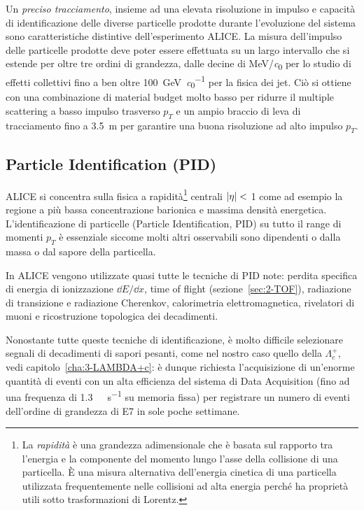         Un \textit{preciso tracciamento}, insieme ad una elevata risoluzione in impulso e capacità di identificazione delle diverse particelle prodotte durante l’evoluzione del sistema sono caratteristiche distintive dell’esperimento ALICE. La misura dell’impulso delle particelle prodotte deve poter essere effettuata su un largo intervallo che si estende per oltre tre ordini di grandezza, dalle decine di \unit[per-mode = symbol]{\mega \eV \per \clight} per lo studio di effetti collettivi fino a ben oltre \qty[per-mode = symbol]{100}{\giga \eV \per \clight} per la fisica dei jet. Ciò si ottiene con una combinazione di material budget molto basso per ridurre il multiple scattering a basso impulso trasverso $p_{T}$ e un ampio braccio di leva di tracciamento fino a \qty{3.5}{\meter} per garantire una buona risoluzione ad alto impulso $p_{T}$.

    \subsection{Particle Identification (PID)}
        ALICE si concentra sulla fisica a rapidità\footnote{La \textit{rapidità} è una grandezza adimensionale che è basata sul rapporto tra l’energia e la componente del momento lungo l’asse della collisione di una particella. È una misura alternativa dell’energia cinetica di una particella utilizzata frequentemente nelle collisioni ad alta energia perché ha proprietà utili sotto trasformazioni di Lorentz.} centrali $\abs{\eta} <$ \num{1} come ad esempio la regione a più bassa concentrazione barionica e massima densità energetica. L’identificazione di particelle (Particle Identification, PID) su tutto il range di momenti $p_{T}$ è essenziale siccome molti altri osservabili sono dipendenti o dalla massa o dal sapore della particella.

        In ALICE vengono utilizzate quasi tutte le tecniche di PID note: perdita specifica di energia di ionizzazione $\dd{E}\!/\!\dd{x}$, time of flight (sezione~\ref{sec:2-TOF}), radiazione di transizione e radiazione Cherenkov, calorimetria elettromagnetica, rivelatori di muoni e ricostruzione topologica dei decadimenti.

        Nonostante tutte queste tecniche di identificazione, è molto difficile selezionare segnali di decadimenti di sapori pesanti, come nel nostro caso quello della $\Lambda_{c}^{+}$, vedi capitolo~\ref{cha:3-LAMBDA+c}: è dunque richiesta l’acquisizione di un’enorme quantità di eventi con un alta efficienza del sistema di Data Acquisition (fino ad una frequenza di \qty[per-mode = symbol]{1.3}{\giga \byte \per \second} su memoria fissa) per registrare un numero di eventi dell’ordine di grandezza di \num{E7} in sole poche settimane.
        
